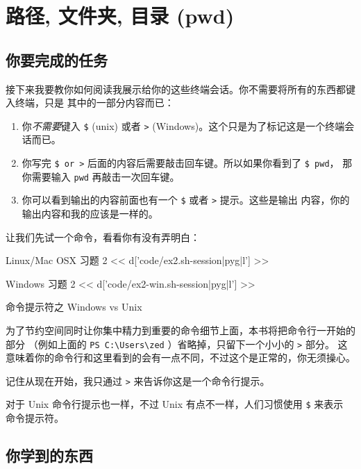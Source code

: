 \chapter{路径, 文件夹, 目录 (pwd)}

\section{你要完成的任务}

接下来我要教你如何阅读我展示给你的这些终端会话。你不需要将所有的东西都键入终端，只是
其中的一部分内容而已：

\begin{enumerate} 
\item 你\emph{不需要}键入 \verb|$| (unix) 或者
    \verb|>| (Windows)。这个只是为了标记这是一个终端会话而已。
\item 你写完 \verb|$ or >| 后面的内容后需要敲击回车键。所以如果你看到了 \verb|$ pwd|，
那你需要输入 \verb|pwd| 再敲击一次回车键。
\item 你可以看到输出的内容前面也有一个 \verb|$| 或者 \verb|>| 提示。这些是输出
内容，你的输出内容和我的应该是一样的。
\end{enumerate}

让我们先试一个命令，看看你有没有弄明白：

\begin{code}{Linux/Mac OSX 习题 2}
<< d['code/ex2.sh-session|pyg|l'] >>
\end{code}

\begin{code}{Windows 习题 2}
<< d['code/ex2-win.sh-session|pyg|l'] >>
\end{code}

\begin{aside}{命令提示符之 Windows vs Unix }

为了节约空间同时让你集中精力到重要的命令细节上面，本书将把命令行一开始的部分
（例如上面的 \verb|PS C:\Users\zed| ）省略掉，只留下一个小小的 \verb|>| 部分。
这意味着你的命令行和这里看到的会有一点不同，不过这个是正常的，你无须操心。

记住从现在开始，我只通过 \verb|>| 来告诉你这是一个命令行提示。

对于 Unix 命令行提示也一样，不过 Unix 有点不一样，人们习惯使用 \verb|$| 来表示
命令提示符。

\end{aside}

\section{你学到的东西}

